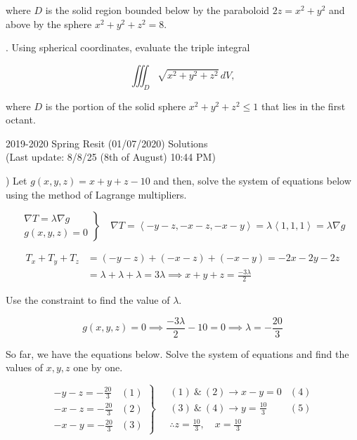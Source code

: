 \documentclass{article}
\begin{document}
\hfill

\noindent where $D$ is the solid region bounded below by the paraboloid $2z=x^2+y^2$ and above by the sphere $x^2+y^2+z^2=8$.

\hfill

. Using spherical coordinates, evaluate the triple integral

\[\iiint_D\sqrt{x^2+y^2+z^2}\,dV,\]

\hfill

\noindent where $D$ is the portion of the solid sphere $x^2+y^2+z^2\leq1$ that lies in the first octant.

\newpage

\begin{center}
2019-2020 Spring Resit (01/07/2020) Solutions\\
(Last update: 8/8/25 (8th of August) 10:44 PM)
\end{center}

) Let $g(x,y,z)=x+y+z-10$ and then, solve the system of equations below using the method of Lagrange multipliers.

\[
\left.
\begin{array}{ll}
\displaystyle\nabla T =\lambda \nabla g\\
\displaystyle g(x,y,z) = 0
\end{array}
\right\}\quad
\nabla T = \left\langle-y-z,-x-z,-x-y\right\rangle=\lambda\left\langle1,1,1\right\rangle= \lambda\nabla g
\]

\begin{align*}T_x+T_y + T_z&=(-y-z) +(-x-z) +(-x-y)=-2x-2y-2z\\&=\lambda+\lambda+\lambda=3\lambda\implies x+y+z=\frac{-3\lambda}{2}\end{align*}

\hfill

\noindent Use the constraint to find the value of $\lambda$.

\[g(x,y,z) = 0 \implies \frac{-3\lambda}{2}-10=0\implies \lambda=-\frac{20}{3}\]

\hfill

\noindent So far, we have the equations below. Solve the system of equations and find the values of $x,y,z$ one by one.

\[
\left.
\begin{array}{ll}
\displaystyle -y-z=-\frac{20}{3}&(1)\\[0.5cm]
\displaystyle -x-z=-\frac{20}{3}&(2)\\[0.5cm]
\displaystyle -x-y=-\frac{20}{3}&(3)
\end{array}
\right\}\quad
\begin{array}{ll}
\displaystyle (1)\:\&\:(2)\rightarrow x-y=0 & (4) \\[0.2cm]
\displaystyle (3)\:\&\:(4)\rightarrow y=\frac{10}{3}&(5)\\[0.5cm]
\displaystyle\therefore z=\frac{10}{3},\quad x=\frac{10}{3}
\end{array}
\]
\end{document}
